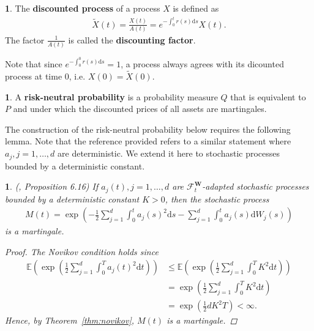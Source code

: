 \documentclass[english]{article}
\numberwithin{equation}{section}
\numberwithin{figure}{section}
\theoremstyle{bolddescit}
\theoremstyle{definition}
\newtheorem{definition}[theorem]{\protect\definitionname}
\theoremstyle{definition}
\theoremstyle{plain}
\newtheorem{lemma}[theorem]{\protect\lemmaname}
\theoremstyle{plain}
\theoremstyle{bolddesc}
\theoremstyle{plain}
\theoremstyle{remark}
\providecommand{\definitionname}{Definition}
\providecommand{\lemmaname}{Lemma}
\begin{document}
\begin{definition}
  The \textbf{discounted process} of a process $X$ is defined as
  \begin{align*}
    \widetilde{X}(t) = \frac{X(t)}{A(t)} = e^{-\int_0^t r(s) \mathrm{d}s} X(t).
  \end{align*}
  The factor $\frac{1}{A(t)}$ is called the \textbf{discounting factor}.
\end{definition}

Note that since $e^{-\int_0^0 r(s) \mathrm{d}s} = 1$, a process always agrees with its dicounted process at time 0, i.e. $X(0) = \widetilde{X}(0)$.

\begin{definition}
  A \textbf{risk-neutral probability} is a probability measure $Q$ that is equivalent to $P$ and under which the discounted prices of all assets are martingales.
\end{definition}

The construction of the risk-neutral probability below requires the following lemma. Note that the reference provided refers to a similar statement where $a_j, j=1,\ldots,d$ are deterministic. We extend it here to stochastic processes bounded by a deterministic constant.

\begin{lemma}\label{lem:bs-exponential-martingale}
  (\cite{capinski_blackscholes_2012}, Proposition 6.16)
  If $a_j(t), j=1,\ldots,d$ are $\mathcal{F}^\mathbf{W}_t$-adapted stochastic processes bounded by a deterministic constant $K > 0$, then the stochastic process
  \begin{align*}
    M(t) = \exp \left( - \frac{1}{2} \sum_{j=1}^{d} \int_0^t a_j(s)^2 \mathrm{d}s - \sum_{j=1}^{d} \int_0^t a_j(s) \mathrm{d}W_j(s) \right)
  \end{align*}
  is a martingale.

  \begin{proof}
    The Novikov condition holds since
    \begin{align*}
      \mathbb{E}\left(\exp \left(\frac{1}{2} \sum_{j=1}^d \int_0^T a_j(t)^2 \mathrm{d}t\right)\right)
      &\le \mathbb{E}\left(\exp \left(\frac{1}{2} \sum_{j=1}^d \int_0^T K^2 \mathrm{d}t\right)\right)\\
      &= \exp \left(\frac{1}{2} \sum_{j=1}^d \int_0^T K^2 \mathrm{d}t\right)\\
      &= \exp \left(\frac{1}{2} d K^2 T \right) < \infty.
    \end{align*}
    Hence, by Theorem~\ref{thm:novikov}, $M(t)$ is a martingale.
  \end{proof}
\end{lemma}
\end{document}
